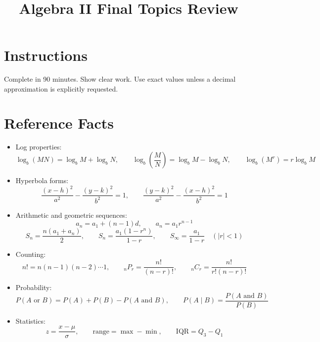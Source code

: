 \documentclass[12pt]{article}
\title{Algebra II Final Topics Review}
\author{}
\date{}
\begin{document}
\maketitle

\section*{Instructions}
Complete in 90 minutes. Show clear work. Use exact values unless a decimal approximation is explicitly requested.

\section*{Reference Facts}
\begin{itemize}[leftmargin=1.5em]
  \item Log properties:
  \[
  \log_b(MN)=\log_bM+\log_bN,\qquad
  \log_b\!\left(\frac{M}{N}\right)=\log_bM-\log_bN,\qquad
  \log_b(M^r)=r\log_bM
  \]
  \item Hyperbola forms:
  \[
  \frac{(x-h)^2}{a^2}-\frac{(y-k)^2}{b^2}=1,\qquad
  \frac{(y-k)^2}{a^2}-\frac{(x-h)^2}{b^2}=1
  \]
  \item Arithmetic and geometric sequences:
  \[
  a_n=a_1+(n-1)d,\qquad
  a_n=a_1r^{n-1}
  \]
  \[
  S_n=\frac{n(a_1+a_n)}{2},\qquad
  S_n=\frac{a_1(1-r^n)}{1-r},\qquad
  S_\infty=\frac{a_1}{1-r}\quad(|r|<1)
  \]
  \item Counting:
  \[
  n!=n(n-1)(n-2)\cdots 1,\qquad
  {}_nP_r=\frac{n!}{(n-r)!},\qquad
  {}_nC_r=\frac{n!}{r!(n-r)!}
  \]
  \item Probability:
  \[
  P(A\text{ or }B)=P(A)+P(B)-P(A\text{ and }B),\qquad
  P(A\mid B)=\frac{P(A\text{ and }B)}{P(B)}
  \]
  \item Statistics:
  \[
  z=\frac{x-\mu}{\sigma},\qquad
  \text{range}=\max-\min,\qquad
  \mathrm{IQR}=Q_3-Q_1
  \]
\end{itemize}
\end{document}
